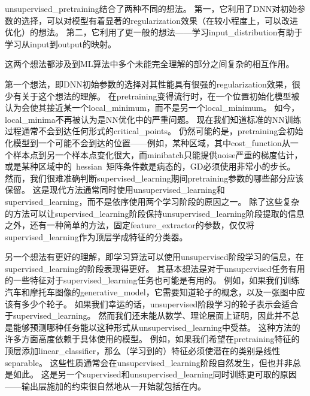 
\gls{unsupervised_pretraining}结合了两种不同的想法。
第一，它利用了\gls{DNN}对初始参数的选择，可以对模型有着显著的\gls{regularization}效果（在较小程度上，可以改进优化）的想法。
第二，它利用了更一般的想法——学习\gls{input_distribution}有助于学习从\gls{input}到\gls{output}的映射。


这两个想法都涉及到\gls{ML}算法中多个未能完全理解的部分之间复杂的相互作用。

第一个想法，即\gls{DNN}初始参数的选择对其性能具有很强的\gls{regularization}效果，很少有关于这个想法的理解。
在\gls{pretraining}变得流行时，在一个位置初始化模型被认为会使其接近某一个\gls{local_minimum}，而不是另一个\gls{local_minimum}。%
如今，\gls{local_minima}不再被认为是\gls{NN}优化中的严重问题。
现在我们知道标准的\gls{NN}训练过程通常不会到达任何形式的\gls{critical_points}。
仍然可能的是，\gls{pretraining}会初始化模型到一个可能不会到达的位置——例如，某种区域，其中\gls{cost_function}从一个样本点到另一个样本点变化很大，而\gls{minibatch}只能提供\gls{noise}严重的梯度估计，或是某种区域中的~\gls{hessian}~矩阵条件数是病态的，\gls{GD}必须使用非常小的步长。
然而，我们很难准确判断\gls{supervised_learning}期间\gls{pretraining}参数的哪些部分应该保留。
这是现代方法通常同时使用\gls{unsupervised_learning}和\gls{supervised_learning}，而不是依序使用两个学习阶段的原因之一。
除了这些复杂的方法可以让\gls{supervised_learning}阶段保持\gls{unsupervised_learning}阶段提取的信息之外，还有一种简单的方法，固定\gls{feature_extractor}的参数，仅仅将\gls{supervised_learning}作为顶层学成特征的分类器。


另一个想法有更好的理解，即学习算法可以使用\gls{unsupervised}阶段学习的信息，在\gls{supervised_learning}的阶段表现得更好。
其基本想法是对于\gls{unsupervised}任务有用的一些特征对于\gls{supervised_learning}任务也可能是有用的。
例如，如果我们训练汽车和摩托车图像的\gls{generative_model}，它需要知道轮子的概念，以及一张图中应该有多少个轮子。
如果我们幸运的话，\gls{unsupervised}阶段学习的轮子表示会适合于\gls{supervised_learning}。
然而我们还未能从数学、理论层面上证明，因此并不总是能够预测哪种任务能以这种形式从\gls{unsupervised_learning}中受益。
这种方法的许多方面高度依赖于具体使用的模型。
例如，如果我们希望在\gls{pretraining}特征的顶层添加\gls{linear_classifier}，那么（学习到的）特征必须使潜在的类别是线性\gls{separable}。%
这些性质通常会在\gls{unsupervised_learning}阶段自然发生，但也并非总是如此。
这是另一个\gls{supervised}和\gls{unsupervised_learning}同时训练更可取的原因——输出层施加的约束很自然地从一开始就包括在内。

